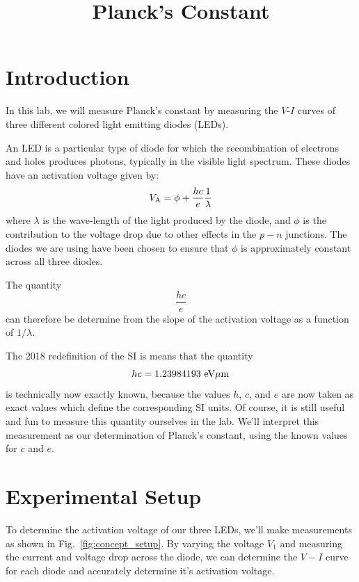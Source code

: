 \documentclass[12pt]{article}
\begin{document}

\title{Planck's Constant} 

\maketitle

\section{Introduction}

In this lab, we will measure Planck's constant by measuring the
$V$-$I$ curves of three different colored light emitting diodes
(LEDs).

An LED is a particular type of diode for which the recombination of
electrons and holes produces photons, typically in the visible light
spectrum.  These diodes have an activation voltage given by:
\begin{equation} \label{eqn:va}
V_{\rm A} = \phi + \frac{hc}{e}\frac{1}{\lambda}
\end{equation}
where $\lambda$ is the wave-length of the light produced by the diode,
and $\phi$ is the contribution to the voltage drop due to other
effects in the $p-n$ junctions.  The diodes we are using have been
chosen to ensure that $\phi$ is approximately constant across all
three diodes.

The quantity
\begin{displaymath}
\frac{hc}{e}
\end{displaymath}
can therefore be determine from the slope of the activation voltage as a function of $1/\lambda$.

The 2018 redefinition of the SI is means that the quantity
\begin{displaymath}
hc = 1.23984193~\rm eV \mu m
\end{displaymath}
is technically now exactly known, because the values $h$, $c$, and $e$
are now taken as exact values which define the corresponding SI
units. Of course, it is still useful and fun to measure this quantity
ourselves in the lab.  We'll interpret this measurement as our
determination of Planck's constant, using the known values for $c$ and
$e$.

\section{Experimental Setup}

To determine the activation voltage of our three LEDs, we'll make measurements as shown in Fig.~\ref{fig:concept_setup}.  By varying the voltage $V_1$ and measuring the current and voltage drop across the diode, we can determine the $V-I$ curve for each diode and accurately determine it's activation voltage.
\end{document}
